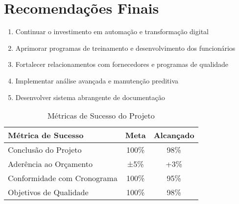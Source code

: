 \documentclass[12pt,a4paper]{report}
\begin{document}
\section{Recomendações Finais}
\begin{enumerate}
   \item Continuar o investimento em automação e transformação digital
   \item Aprimorar programas de treinamento e desenvolvimento dos funcionários
   \item Fortalecer relacionamentos com fornecedores e programas de qualidade
   \item Implementar análise avançada e manutenção preditiva
   \item Desenvolver sistema abrangente de documentação
\end{enumerate}
\begin{table}[H]
\centering
\caption{Métricas de Sucesso do Projeto}
\label{tab:success-metrics}
\begin{tabular}{@{}lcc@{}}
\toprule
Métrica de Sucesso & Meta & Alcançado \\
\midrule
Conclusão do Projeto & 100\% & 98\% \\
Aderência ao Orçamento & ±5\% & +3\% \\
Conformidade com Cronograma & 100\% & 95\% \\
Objetivos de Qualidade & 100\% & 98\% \\
\bottomrule
\end{tabular}
\end{table}
\end{document}
